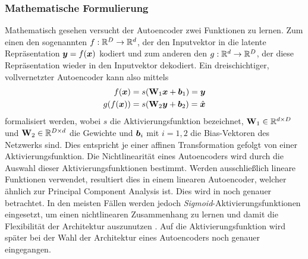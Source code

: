 \subsubsection{Mathematische Formulierung}
\label{ch:MethodenDerDimRed:ML:AE:MathematischeFormulierung}
Mathematisch gesehen versucht der Autoencoder zwei Funktionen zu lernen. Zum einen den sogenannten  $f: \mathbb{R}^D \rightarrow \mathbb{R}^d$, der den Inputvektor in die latente Repräsentation $\bm{y} = f(\bm{x})$ kodiert und zum anderen den  $g: \mathbb{R}^d \rightarrow \mathbb{R}^D$, der diese Repräsentation wieder in den Inputvektor dekodiert. Ein dreischichtiger, vollvernetzter Autoencoder kann also mittels
\begin{align}
	\label{eq:dreischichtigerAE}
	f(\bm{x})    & = s(\mathbf{W}_1 \bm{x} + \bm{b}_1) = \bm{y}             \\
	g(f(\bm{x})) & = s(\mathbf{W}_2 \bm{y} + \bm{b}_2) = \hat{\bm{x}}
\end{align}
formalisiert werden, wobei $s$ die Aktivierungsfunktion bezeichnet, $\mathbf{W}_1 \in \mathbb{R}^{d \times D}$ und $\mathbf{W}_2 \in \mathbb{R}^{D \times d}$ die Gewichte und $\bm{b}_i$ mit $i = 1,2$ die Bias-Vektoren des Netzwerks sind. Dies entspricht je einer affinen Transformation gefolgt von einer Aktivierungsfunktion. Die Nichtlinearität eines Autoencoders wird durch die Auswahl dieser Aktivierungsfunktionen bestimmt.
Werden ausschließlich lineare Funktionen verwendet, resultiert dies in einem linearen Autoencoder,
welcher ähnlich zur Principal Component Analysis ist. Dies wird in
 noch genauer betrachtet. In den meisten Fällen werden
jedoch \textit{Sigmoid}-Aktivierungsfunktionen eingesetzt, um einen nichtlinearen Zusammenhang zu
lernen und damit die Flexibilität der Architektur auszunutzen \parencite[4]{Charte.2018}. Auf die Aktivierungsfunktion wird später bei der Wahl der Architektur eines
Autoencoders noch genauer eingegangen.

